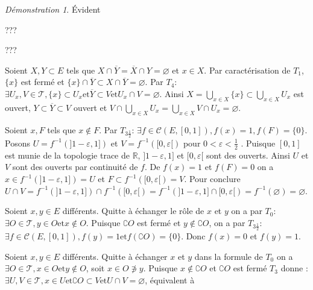 \documentclass[a4paper, 11pt, french]{book}
\newenvironment{itemise}{\itemize}{\enditemize}
\theoremstyle{plain} %
\theoremstyle{definition} %
\theoremstyle{remark} %
\newtheorem*{demonstration}{Démonstration}
\newcommand{\1}{\mathds{1}}
\newcommand\vide{\varnothing}
\newcommand{\inv}[1]{#1^{-1}}
\newcommand{\et}{\mathrel{\mathrm{et}}}
\newcommand{\R}{\mathbb{R}}
\renewcommand{\cal}[1]{\mathcal{#1}}
\newcommand{\scr}[1]{\mathscr{#1}}
\begin{document}
\begin{demonstration}
	\begin{itemise}
		\item[$T_5\Rightarrow T_4$ et $T_{2\frac{1}{2}}\Rightarrow T_2\Rightarrow T_1\Rightarrow T_0$:] Évident
		\item[$T_1+T_4\Rightarrow T_{3\frac{1}{2}}$:] {\color{green} ???}
		\item[$T_3+T_4\Rightarrow T_{3\frac{1}{2}}$:] {\color{green} ???}
			{\color{red}
				\item[$T_1+T_4\Rightarrow T_5$:] Soient $X, Y\subset E$ tels que $X\cap\overline{Y}=\overline{X}\cap Y=\vide$ et $x\in X$.
				Par caractérisation de $T_1$, $\{x\}$ est fermé et $\{x\}\cap\overline{Y}\subset X\cap\overline{Y}=\vide$.
				Par $T_4$: $\exists U_x, V\in\scr{T}, \{x\}\subset U_x\et\overline{Y}\subset V\et U_x\cap V=\vide$.
				Ainsi $X=\bigcup_{x\in X}\{x\}\subset\bigcup_{x\in X}U_x$ est ouvert, $Y\subset\overline{Y}\subset V$ ouvert et $V\cap\bigcup_{x\in X}U_x=\bigcup_{x\in X}V\cap U_x=\vide$.
			}
		\item[$T_{3\frac{1}{2}}\Rightarrow T_3$:] Soient $x, F$ tels que $x\notin F$.
		Par $T_{3\frac{1}{2}}$: $\exists f\in\cal{C}(E, [0, 1]), f(x)=1, f(F)=\{0\}$.
		Posons $U=\inv{f}(]1-\varepsilon, 1])$ et $V=\inv{f}([0, \varepsilon[)$ pour $0<\varepsilon<\frac{1}{2}$ .
		Puisque $[0, 1]$ est munie de la topologie trace de $\R$, $]1-\varepsilon, 1]$ et $[0, \varepsilon[$ sont des ouverts.
		Ainsi $U$ et $V$ sont des ouverts par continuité de $f$.
		De $f(x)=1$ et $f(F)=0$ on a $x\in\inv{f}(]1-\varepsilon, 1])=U$ et $F\subset\inv{f}([0, \varepsilon[)=V$.
		Pour conclure $U\cap V=\inv{f}(]1-\varepsilon, 1])\cap\inv{f}([0, \varepsilon[)=\inv{f}(]1-\varepsilon, 1]\cap[0, \varepsilon[)=\inv{f}(\vide)=\vide$.
		\item[$T_0+T_{3\frac{1}{2}}\Rightarrow T_{2\frac{3}{4}}$:] Soient $x, y\in E$ différents.
		Quitte à échanger le rôle de $x$ et $y$ on a par $T_0$: $\exists O\in\scr{T}, y\in O\et x\notin O$.
		Puisque $\complement O$ est fermé et $y\notin\complement O$, on a par $T_{3\frac{1}{2}}$: $\exists f\in\cal{C}(E, [0, 1]), f(y)=1\et f(\complement O)=\{0\}$.
		Donc $f(x)=0$ et $f(y)=1$.
		\item[$T_0+T_3\Rightarrow T_{2\frac{1}{2}}$:] Soient $x, y\in E$ différents.
		Quitte à échanger $x$ et $y$ dans la formule de $T_0$ on a $\exists O\in\scr{T}, x\in O\et y\notin O$, soit $x\in O\not\ni y$.
		Puisque $x\notin\complement O$ et $\complement O$ est fermé $T_3$ donne :
		$\exists U, V\in\scr{T}, x\in U\et\complement O\subset V\et U\cap V=\vide$, équivalent à

\end{itemise}
\end{demonstration}
\end{document}
